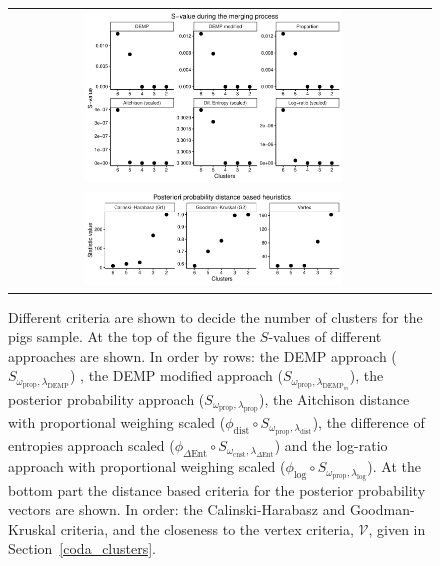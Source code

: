 \documentclass[submit]{smj}
\theoremstyle{definition}
\begin{document}
\begin{figure}[thpb]
\begin{center}
\begin{tabular}{cc}
  \includegraphics[width=0.65\textwidth]{figures/multinomial_Svalues_all.pdf} \\
  \includegraphics[width=0.65\textwidth]{figures/multinomial_statistics.pdf} 
 \end{tabular}
\caption{Different criteria are shown to decide the number of clusters for the pigs sample. At the top of the figure the $S$-values of different approaches are shown. In order by rows: the DEMP approach \citep{hennig2010methods} ($S_{\omega_{\text{prop}}, \lambda_{\text{DEMP}}}$) , the DEMP modified approach \citep{longford2014} ($S_{\omega_{\text{prop}}, \lambda_{\text{DEMP}_m}}$), the posterior probability approach ($S_{\omega_{\text{prop}}, \lambda_{\text{prop}}}$), the Aitchison distance with proportional weighing scaled ($\phi_{\text{dist}} \circ S_{\omega_\text{prop}, \lambda_{\text{dist}}}$), the difference of entropies approach scaled ($\phi_{\Delta\text{Ent}} \circ S_{\omega_{\text{cnst}}, \lambda_{\Delta\text{Ent}}}$) and the log-ratio approach with proportional weighing scaled ($\phi_{\log} \circ S_{\omega_{\text{prop}}, \lambda_{\log}}$). At the bottom part the distance based criteria for the posterior probability vectors are shown. In order: the Calinski-Harabasz and Goodman-Kruskal criteria, and the closeness to the vertex criteria, $\mathcal{V}$, given in Section~\ref{coda_clusters}.}\label{multinomial_statistics}
\end{center}
\end{figure}
\end{document}
